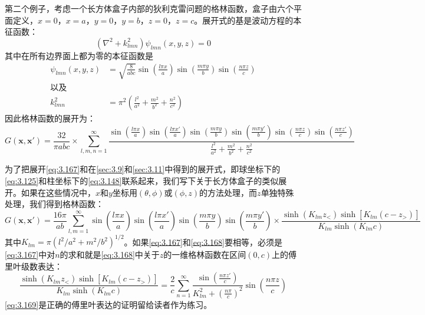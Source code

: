 \documentclass[12pt]{book}
\numberwithin{equation}{chapter}
\numberwithin{figure}{chapter}
\numberwithin{footnote}{page}
\begin{document}
第二个例子，考虑一个长方体盒子内部的狄利克雷问题的格林函数，盒子由六个平面定义，$x=0$，$x=a$，$y=0$，$y=b$，$z=0$，$z=c$。展开式的基是波动方程的本征函数：
\begin{equation}\label{eq:3.165}
    (\nabla^2+k_{lmn}^2)\psi_{lmn}(x,y,z)=0
\end{equation}
其中在所有边界面上都为零的本征函数是
\begin{equation}\label{eq:3.166}
    \begin{aligned}
        \psi_{lmn}(x,y,z)&=\sqrt{\frac{8}{abc}}\sin(\frac{l \pi x}{a})\sin(\frac{m \pi y}{b})\sin(\frac{n \pi z}{c}) \\
        \mbox{以及}&\\
        k_{lmn}^2&=\pi^2(\frac{l^2}{a^2}+\frac{m^2}{b^2}+\frac{n^2}{c^2})
    \end{aligned}
\end{equation}
因此格林函数的展开为：
\begin{equation}\label{eq:3.167}
    G(\mathbf{x},\mathbf{x'})=\frac{32}{\pi abc}\times\sum_{l,m,n=1}^\infty \frac{\sin(\frac{l\pi x}{a})\sin(\frac{l\pi x'}{a})\sin(\frac{m\pi y}{b})\sin(\frac{m\pi y'}{b})\sin(\frac{n\pi z}{c})\sin(\frac{n\pi z'}{c})}{\frac{l^2}{a^2}+\frac{m^2}{b^2}+\frac{n^2}{c^2}}
\end{equation}

为了把展开\autoref{eq:3.167}和在\autoref{sec:3.9}和\autoref{sec:3.11}中得到的展开式，即球坐标下的\autoref{eq:3.125}和柱坐标下的\autoref{eq:3.148}联系起来，我们写下关于长方体盒子的类似展开。如果在这些情况中，$x$和$y$坐标用$(\theta,\phi)$或$(\phi,z)$的方法处理，而$z$单独特殊处理，我们得到格林函数：
\begin{equation}\label{eq:3.168}
    G(\mathbf{x},\mathbf{x'})=\frac{16\pi}{ab}\sum_{l,m=1}^\infty \sin(\frac{l\pi x}{a})\sin(\frac{l\pi x'}{a})\sin(\frac{m\pi y}{b})\sin(\frac{m\pi y'}{b})\times\frac{\sinh(K_{lm}z_<)\sinh[K_{lm}(c-z_>)]}{K_{lm}\sinh(K_{lm} c)}
\end{equation}
其中$K_{lm}=\pi(l^2/a^2+m^2/b^2)^{1/2}$。如果\autoref{eq:3.167}和\autoref{eq:3.168}要相等，必须是\autoref{eq:3.167}中对$n$的求和就是\autoref{eq:3.168}中关于$z$的一维格林函数在区间$(0,c)$上的傅里叶级数表达：
\begin{equation}\label{eq:3.169}
    \frac{\sinh(K_{lm}z_<)\sinh[K_{lm}(c-z_>)]}{K_{lm}\sinh(K_{lm} c)}=\frac{2}{c}\sum_{n=1}^\infty \frac{\sin(\frac{n\pi z'}{c})}{K_{lm}^2+(\frac{n\pi}{c})^2}\sin(\frac{n\pi z}{c})
\end{equation}
\autoref{eq:3.169}是正确的傅里叶表达的证明留给读者作为练习。
\end{document}
